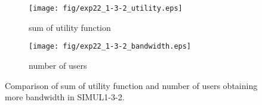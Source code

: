 	\begin{figure}
		\begin{center}
			\begin{subfigure}[b]{0.8\textwidth}
				\centering
				\texttt{[image: fig/exp22\_1-3-2\_utility.eps]}
				\caption{sum of utility function}
				\label{figure:simul1_3_2_u_a}
			\end{subfigure}
			\begin{subfigure}[b]{0.8\textwidth}
				\centering
				\texttt{[image: fig/exp22\_1-3-2\_bandwidth.eps]}
				\caption{number of users}
				\label{figure:simul1_3_2_u_b}
			\end{subfigure}
			\caption{Comparison of sum of utility function and number of users obtaining more bandwidth in SIMUL1-3-2.}
			\label{figure:simul1_3_2_u}
		\end{center}
	\end{figure}

\clearpage

